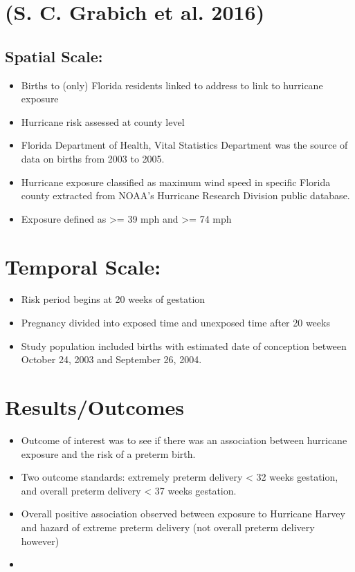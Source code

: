\documentclass[
]{article}
\providecommand{\tightlist}{%
  \setlength{\itemsep}{0pt}\setlength{\parskip}{0pt}}
\begin{document}
\hypertarget{grabich2016hurricane}{%
\section{(S. C. Grabich et al. 2016)}\label{grabich2016hurricane}}

\hypertarget{spatial-scale-3}{%
\subsection{Spatial Scale:}\label{spatial-scale-3}}

\begin{itemize}
\tightlist
\item
  Births to (only) Florida residents linked to address to link to
  hurricane exposure
\item
  Hurricane risk assessed at county level
\item
  Florida Department of Health, Vital Statistics Department was the
  source of data on births from 2003 to 2005.
\item
  Hurricane exposure classified as maximum wind speed in specific
  Florida county extracted from NOAA's Hurricane Research Division
  public database.
\item
  Exposure defined as \textgreater{}= 39 mph and \textgreater{}= 74 mph
\end{itemize}

\hypertarget{temporal-scale-1}{%
\section{Temporal Scale:}\label{temporal-scale-1}}

\begin{itemize}
\tightlist
\item
  Risk period begins at 20 weeks of gestation
\item
  Pregnancy divided into exposed time and unexposed time after 20 weeks
\item
  Study population included births with estimated date of conception
  between October 24, 2003 and September 26, 2004.
\end{itemize}

\hypertarget{resultsoutcomes-3}{%
\section{Results/Outcomes}\label{resultsoutcomes-3}}

\begin{itemize}
\item
  Outcome of interest was to see if there was an association between
  hurricane exposure and the risk of a preterm birth.
\item
  Two outcome standards: extremely preterm delivery \textless{} 32 weeks
  gestation, and overall preterm delivery \textless{} 37 weeks
  gestation.
\item
  Overall positive association observed between exposure to Hurricane
  Harvey and hazard of extreme preterm delivery (not overall preterm
  delivery however)
\item
\end{itemize}
\end{document}
